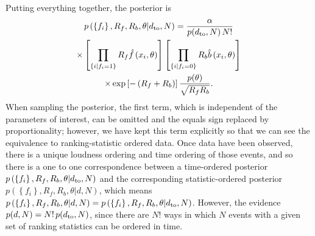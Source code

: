 \documentclass[aps,prd,reprint,nofootinbib]{revtex4-1}
\newcommand{\mathset}[1]{\left\{ #1 \right\}}
\begin{document}
Putting everything together, the posterior is
\begin{multline}
  \label{eq:posterior}
  p\left( \mathset{f_i}, R_f, R_b, \theta | d_{\rm to},N \right) =
  \frac{\alpha}{p(d_{\rm to},N)\,N!} \\ \times \left[ \prod_{\mathset{i | f_i =
        1}} R_f \hat{f}\left(x_i, \theta\right) \right] \left[
    \prod_{\mathset{i | f_i = 0}} R_b \hat{b}\left( x_i, \theta\right)
    \right] \\ \times \exp\left[ - \left(R_f + R_b\right) \right]
  \frac{p(\theta)}{\sqrt{R_f R_b}}.
\end{multline}
When sampling the posterior, the first term, which is independent of
the parameters of interest, can be omitted and the equals sign
replaced by proportionality; however, we have kept this term
explicitly so that we can see the equivalence to ranking-statistic
ordered data. Once data have been observed, there is a unique loudness
ordering and time ordering of those events, and so there is a one to
one correspondence between a time-ordered posterior $p\left(
\mathset{f_i}, R_f, R_b, \theta | d_{\rm to},N \right)$ and the
corresponding statistic-ordered posterior $ p\left( \mathset{f_i},
R_f, R_b, \theta | d,N \right)$, which means $p\left( \mathset{f_i},
R_f, R_b, \theta | d,N \right) = p\left( \mathset{f_i}, R_f, R_b,
\theta | d_{\rm to},N \right)$. However, the evidence $p(d,N) =
N!\,p(d_{\rm to},N)$, since there are $N!$ ways in which $N$ events
with a given set of ranking statistics can be ordered in time.
\end{document}
